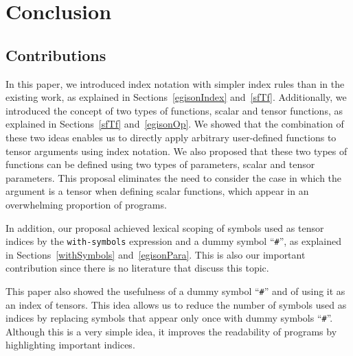 \documentclass[acmlarge]{acmart}
\begin{document}
\section{Conclusion}\label{conclusion}

\subsection{Contributions}

In this paper, we introduced index notation with simpler index rules than in the existing work, as explained in Sections~\ref{egisonIndex} and~\ref{sfTf}.
Additionally, we introduced the concept of two types of functions, scalar and tensor functions, as explained in Sections~\ref{sfTf} and~\ref{egisonOp}.
We showed that the combination of these two ideas enables us to directly apply arbitrary user-defined functions to tensor arguments using index notation.
We also proposed that these two types of functions can be defined using two types of parameters, scalar and tensor parameters.
This proposal eliminates the need to consider the case in which the argument is a tensor when defining scalar functions, which appear in an overwhelming proportion of programs.

In addition, our proposal achieved lexical scoping of symbols used as tensor indices by the \texttt{with-symbols} expression and a dummy symbol ``\texttt{\#}'', as explained in Sections~\ref{withSymbols} and~\ref{egisonPara}.
This is also our important contribution since there is no literature that discuss this topic.

This paper also showed the usefulness of a dummy symbol ``\texttt{\#}'' and of using it as an index of tensors.
This idea allows us to reduce the number of symbols used as indices by replacing symbols that appear only once with dummy symbols ``\texttt{\#}''.
Although this is a very simple idea, it improves the readability of programs by highlighting important indices.
\end{document}
